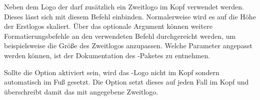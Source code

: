 \begin{Declaration}{\LParameter{}}
\printdeclarationlist%
%
%
Neben dem Logo der \TnUD darf zusätzlich ein Zweitlogo im Kopf verwendet werden.
Dieses lässt sich mit diesem Befehl einbinden. Normalerweise wird es auf die 
Höhe der Erstlogos skaliert. Über das optionale Argument können weitere 
Formatierungsbefehle an den verwendeten Befehl  
durchgereicht werden, um beispielsweise die Größe des Zweitlogos anzupassen.
Welche Parameter angepasst werden können, ist der Dokumentation des
-Paketes zu entnehmen.

Sollte die Option  aktiviert sein, wird das \DDC-Logo nicht im Kopf 
sondern automatisch im Fuß gesetzt. Die Option  setzt dieses 
auf jeden Fall im Kopf und überschreibt damit das mit  
angegebene Zweitlogo.
\end{Declaration}

